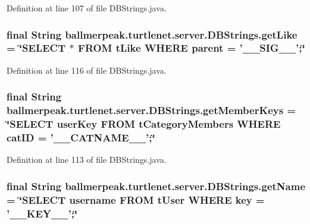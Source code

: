 Definition at line 107 of file D\-B\-Strings.\-java.

\hypertarget{classballmerpeak_1_1turtlenet_1_1server_1_1DBStrings_ae351265e633b120e4897cf92f17d3018}{
\subsubsection[{get\-Like}]{\setlength{\rightskip}{0pt plus 5cm}final String ballmerpeak.\-turtlenet.\-server.\-D\-B\-Strings.\-get\-Like = \char`\"{}S\-E\-L\-E\-C\-T $\ast$ F\-R\-O\-M t\-Like W\-H\-E\-R\-E parent = '\-\_\-\-\_\-\-S\-I\-G\-\_\-\-\_\-';\char`\"{}\hspace{0.3cm}{\ttfamily [static]}}}\label{classballmerpeak_1_1turtlenet_1_1server_1_1DBStrings_ae351265e633b120e4897cf92f17d3018}


Definition at line 116 of file D\-B\-Strings.\-java.

\hypertarget{classballmerpeak_1_1turtlenet_1_1server_1_1DBStrings_af52ab80c3167b21dd0b8c7c61e498e61}{
\subsubsection[{get\-Member\-Keys}]{\setlength{\rightskip}{0pt plus 5cm}final String ballmerpeak.\-turtlenet.\-server.\-D\-B\-Strings.\-get\-Member\-Keys = \char`\"{}S\-E\-L\-E\-C\-T user\-Key F\-R\-O\-M t\-Category\-Members W\-H\-E\-R\-E cat\-I\-D = '\-\_\-\-\_\-\-C\-A\-T\-N\-A\-M\-E\-\_\-\-\_\-';\char`\"{}\hspace{0.3cm}{\ttfamily [static]}}}\label{classballmerpeak_1_1turtlenet_1_1server_1_1DBStrings_af52ab80c3167b21dd0b8c7c61e498e61}


Definition at line 113 of file D\-B\-Strings.\-java.

\hypertarget{classballmerpeak_1_1turtlenet_1_1server_1_1DBStrings_a1a166aed33e92e5a9990201b6d426e07}{
\subsubsection[{get\-Name}]{\setlength{\rightskip}{0pt plus 5cm}final String ballmerpeak.\-turtlenet.\-server.\-D\-B\-Strings.\-get\-Name = \char`\"{}S\-E\-L\-E\-C\-T username F\-R\-O\-M t\-User W\-H\-E\-R\-E key = '\-\_\-\-\_\-\-K\-E\-Y\-\_\-\-\_\-';\char`\"{}\hspace{0.3cm}{\ttfamily [static]}}}\label{classballmerpeak_1_1turtlenet_1_1server_1_1DBStrings_a1a166aed33e92e5a9990201b6d426e07}


